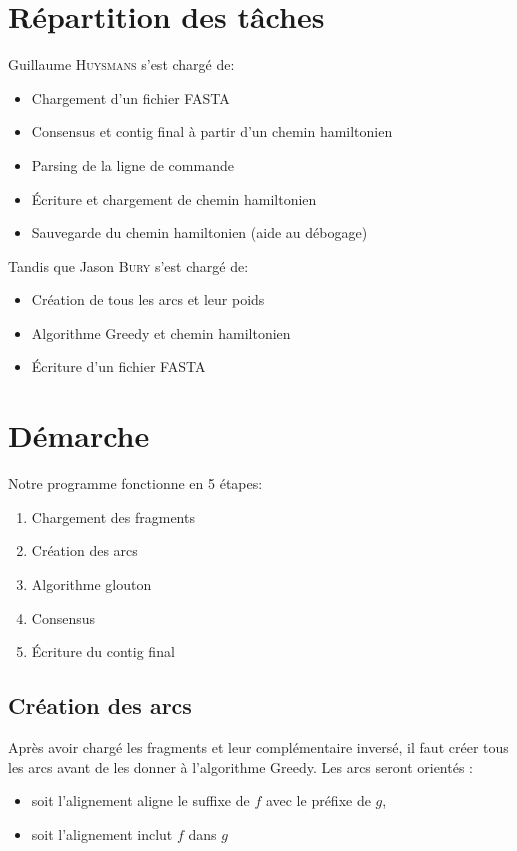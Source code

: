 \documentclass[a4paper, 12pt, titlepage]{article}
\begin{document}



\section{Répartition des tâches}
\noindent Guillaume \textsc{Huysmans} s'est chargé de:
\begin{itemize}
 \item Chargement d'un fichier FASTA
 \item Consensus et contig final à partir d'un chemin hamiltonien
 \item Parsing de la ligne de commande
 \item Écriture et chargement de chemin hamiltonien
 \item Sauvegarde du chemin hamiltonien (aide au débogage)
\end{itemize}
\noindent Tandis que Jason \textsc{Bury} s'est chargé de:
\begin{itemize}
 \item Création de tous les arcs et leur poids
 \item Algorithme Greedy et chemin hamiltonien
 \item Écriture d'un fichier FASTA
\end{itemize}

\section{Démarche}
Notre programme fonctionne en 5 étapes:
\begin{enumerate}
 \item Chargement des fragments
 \item Création des arcs
 \item Algorithme glouton
 \item Consensus
 \item Écriture du contig final
\end{enumerate}

\subsection{Création des arcs}
Après avoir chargé les fragments et leur complémentaire inversé,
il faut créer tous les arcs avant de les donner à l'algorithme Greedy.
Les arcs seront orientés :
\begin{itemize}
	\item soit l'alignement aligne le suffixe de $f$ avec le préfixe de $g$,
	\item soit l'alignement inclut $f$ dans $g$
\end{itemize}
\end{document}
